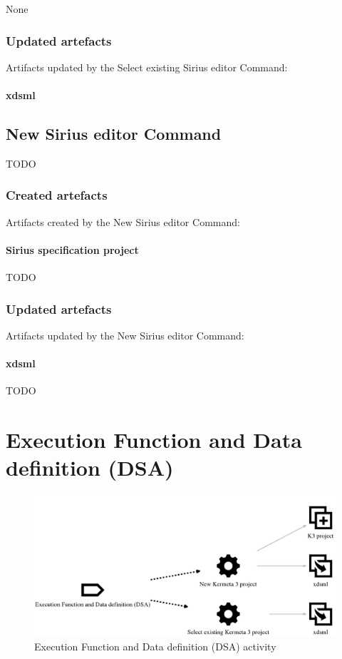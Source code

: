 \documentclass{gemoc} %
\begin{document}
	None
\subsubsection{Updated artefacts}
Artifacts updated by the Select existing Sirius editor Command:
\paragraph{xdsml} 


\subsection{New Sirius editor Command}
TODO
\subsubsection{Created artefacts}
Artifacts created by the New Sirius editor Command:
\paragraph{Sirius specification project} 
TODO
\subsubsection{Updated artefacts}
Artifacts updated by the New Sirius editor Command:
\paragraph{xdsml} 
TODO

\section{Execution Function and Data definition (DSA)}
\label{sec:Execution_Function_and_Data_definition__DSA_}
\begin{figure}[h!]
		\center
		\includegraphics*[trim=0.0cm 0.0cm 0cm 0.0cm, clip=true]{fig/Execution_Function_and_Data_definition__DSA_}
		\caption{Execution Function and Data definition (DSA) activity}
		\label{fig:Execution_Function_and_Data_definition__DSA_}
\end{figure}
\end{document}
